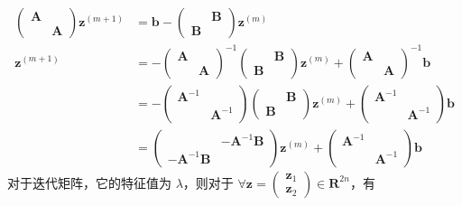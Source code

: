 \documentclass{sjtuarticle}
\begin{document}
\begin{itemize}
\begin{solution}
\begin{itemize}
            \begin{align*}
                \begin{pmatrix}\bm{A} \\ & \bm{A}\end{pmatrix}\bm{z}^{(m+1)}&=\bm{b}-\begin{pmatrix}
                     & \bm{B} \\ \bm{B}
                \end{pmatrix}\bm{z}^{(m)}\\
                \bm{z}^{(m+1)}&=-\begin{pmatrix}\bm{A} \\ & \bm{A}\end{pmatrix}^{-1}\begin{pmatrix}
                    & \bm{B} \\ \bm{B}
               \end{pmatrix}\bm{z}^{(m)}+\begin{pmatrix}\bm{A} \\ & \bm{A}\end{pmatrix}^{-1}\bm{b} \\
               &=-\begin{pmatrix}\bm{A}^{-1} \\ & \bm{A}^{-1}\end{pmatrix}\begin{pmatrix}
                & \bm{B} \\ \bm{B}
                \end{pmatrix}\bm{z}^{(m)}+\begin{pmatrix}\bm{A}^{-1} \\ & \bm{A}^{-1}\end{pmatrix}\bm{b} \\
                &= \begin{pmatrix}
                    & -\bm{A}^{-1}\bm{B} \\ -\bm{A}^{-1}\bm{B} 
                \end{pmatrix}\bm{z}^{(m)}+\begin{pmatrix}\bm{A}^{-1} \\ & \bm{A}^{-1}\end{pmatrix}\bm{b} 
            \end{align*}
            对于迭代矩阵，它的特征值为 $\lambda$，则对于 $\forall \bm{z}=\begin{pmatrix}\bm{z}_1\\\bm{z}_2\end{pmatrix}\in \mathbf{R}^{2n}$，有
            \begin{align*}

\end{align*}
\end{itemize}
\end{solution}
\end{itemize}
\end{document}
